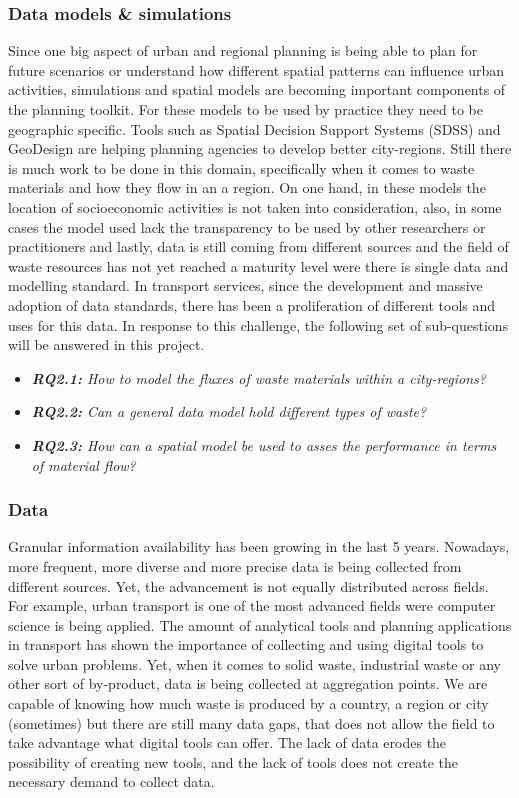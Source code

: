     
\subsubsection{Data models \& simulations}
    Since one big aspect of urban and regional planning is being able to plan for future scenarios or understand how different spatial patterns can influence urban activities, simulations and spatial models are becoming important components of the planning toolkit. For these models to be used by practice they need to be geographic specific. Tools such as Spatial Decision Support Systems (SDSS) and GeoDesign are helping planning agencies to develop better city-regions. Still there is much work to be done in this domain, specifically when it comes to waste materials and how they flow in an a region. On one hand, in these models the location of socioeconomic activities is not taken into consideration, also, in some cases the model used lack the transparency to be used by other researchers or practitioners and lastly, data is still coming from different sources and the field of waste resources has not yet reached a maturity level were there is single data and modelling standard. In transport services, since the development and massive adoption of data standards, there has been a proliferation of different tools and uses for this data. In response to this challenge, the following set of sub-questions will be answered in this project. 
    

    \begin{itemize}
        \item \textit{\textbf{RQ2.1: }How to model the fluxes of waste materials within a city-regions?}
        \item \textit{\textbf{RQ2.2: }Can a general data model hold different types of waste?}
        \item \textit{\textbf{RQ2.3:} How can a spatial model be used to asses the performance in terms of material flow?}
    \end{itemize}


\subsubsection{Data}
    Granular information availability has been growing in the last 5 years. Nowadays, more frequent, more diverse and more precise data is being collected from different sources. Yet, the advancement is not equally distributed across fields. For example, urban transport is one of the most advanced fields were computer science is being applied. The amount of analytical tools and planning applications in transport has shown the importance of collecting and using digital tools to solve urban problems. Yet, when it comes to solid waste, industrial waste or any other sort of by-product, data is being collected at aggregation points. We are capable of knowing how much waste is produced by a country, a region or city  (sometimes) but there are still many data gaps, that does not allow the field to take advantage what digital tools can offer. The lack of data erodes the possibility of creating new tools, and the lack of tools does not create the necessary demand to collect data. 
    
